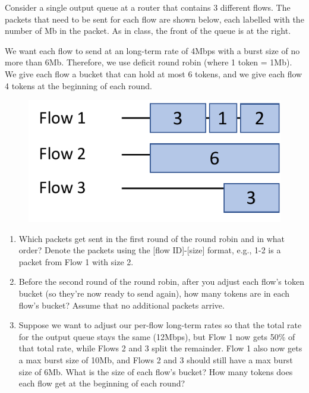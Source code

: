 \documentclass[10pt]{article}
\newenvironment{problem}[2][]{\begin{trivlist}
\item[\hskip \labelsep {\bfseries #1}\hskip \labelsep {\bfseries #2.}]}{\end{trivlist}}
\begin{document}
\begin{problem}{6: Balancing Flow}
Consider a single output queue at a router that contains 3 different flows. The packets that need to be sent for each flow are shown below, each labelled with the number of Mb in the packet. As in class, the front of the queue is at the right.

We want each flow to send at an long-term rate of 4Mbps with a burst size of no more than 6Mb. Therefore, we use deficit round robin (where 1 token = 1Mb). We give each flow a bucket that can hold at most 6 tokens, and we give each flow 4 tokens at the beginning of each round.

\begin{figure}[h]
    \centering
    \includegraphics[scale=0.8]{figures/drr.pdf}
    \label{fig:bin_search}
\end{figure}
\begin{enumerate}
    \item Which packets get sent in the first round of the round robin and in what order? Denote the packets using the [flow ID]-[size] format, e.g., 1-2 is a packet from Flow 1 with size 2.
    \item Before the second round of the round robin, after you adjust each flow’s token bucket (so they’re now ready to send again), how many tokens are in each flow’s bucket? Assume that no additional packets arrive.
    \item Suppose we want to adjust our per-flow long-term rates so that the total rate for the output queue stays the same (12Mbps), but Flow 1 now gets 50\% of that total rate, while Flows 2 and 3 split the remainder. Flow 1 also now gets a max burst size of 10Mb, and Flows 2 and 3 should still have a max burst size of 6Mb. What is the size of each flow's bucket? How many tokens does each flow get at the beginning of each round?
\end{enumerate}
\end{problem}
\end{document}
